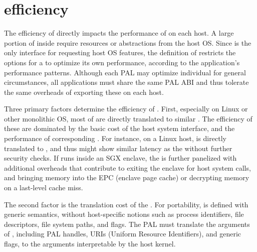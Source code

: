 \section{\hostapi{} efficiency}


The efficiency of \hostapis{} directly impacts the performance of \graphene{} on each host.
A large portion of \linuxapis{} inside \thelibos{} require resources or abstractions from the host OS.
Since \thehostabi{} is the only interface for requesting host OS features,
the definition of \thehostabi{}
restricts the options for a \picoproc{} to optimize its own performance, according to the application's performance patterns.
Although each PAL may optimize individual \hostapi{} for general circumstances,
all applications must share the same PAL ABI and thus tolerate the same overheads of exporting these \hostapis{} on each host.




Three primary factors determine the efficiency of \hostapis{}.
First, especially on Linux or other monolithic OS,
most of \thehostabi{} are directly translated to similar \linuxapis{}.
The efficiency of these \hostapis{}
are dominated by the basic cost of the host system interface,
and the performance of corresponding \linuxapis{}.
For instance, on a Linux host,  is directly translated to , and thus might show similar latency as the \linuxapi{} without further security checks. 
If \graphene{} runs inside an SGX enclave,
the \hostapis{} is further panelized with additional overheads that contribute to exiting the enclave for host system calls, and bringing memory into the EPC (enclave page cache) or decrypting 
memory on a last-level cache miss.


The second factor is the translation cost
of the \hostapis{}.
For portability, \thehostabi{} is defined with generic semantics, without host-specific notions
such as process identifiers, file descriptors,
file system paths,
and \linuxapi{} flags.
The PAL must translate the arguments of \hostapis{}, including PAL handles, URIs (Uniform Resource Identifiers), and generic flags,
to the arguments interpretable by the host kernel.
 


